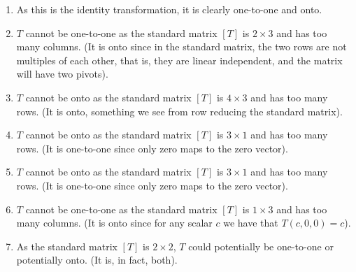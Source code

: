 \begin{enumerate}[!HW!, start=1]
\item As this is the identity transformation, it is clearly one-to-one and onto. %
\item $T$ cannot be one-to-one as the standard matrix $[T]$ is $2\times 3$ and has too many columns. (It is onto since in the standard matrix, the two rows are not multiples of each other, that is, they are linear independent, and the matrix will have two pivots).  %
\item $T$ cannot be onto as the standard matrix $[T]$ is $4\times 3$ and has too many rows. (It is onto, something we see from row reducing the standard matrix). %
\item $T$ cannot be onto as the standard matrix $[T]$ is $3\times 1$ and has too many rows. (It is one-to-one since only zero maps to the zero vector).%
\item $T$ cannot be onto as the standard matrix $[T]$ is $3\times 1$ and has too many rows. (It is one-to-one since only zero maps to the zero vector).\\ %
\item $T$ cannot be one-to-one as the standard matrix $[T]$ is $1\times 3$ and  has too many columns. (It is onto since for any scalar $c$ we have that $T(c,0,0) = c$). %
\item As the standard matrix $[T]$ is $2\times 2$, $T$ could potentially be one-to-one or potentially onto. (It is, in fact, both).  %
\end{enumerate}

\vspace{-15 pt}